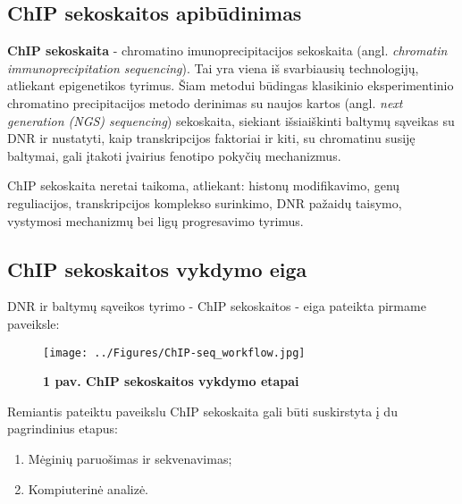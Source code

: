 \documentclass[12pt]{article}
\begin{document}
\subsection{ChIP sekoskaitos apibūdinimas}
\textbf{ChIP sekoskaita} - chromatino imunoprecipitacijos sekoskaita (angl.
\emph{chromatin immunoprecipitation sequencing}). Tai yra viena iš svarbiausių
technologijų, atliekant epigenetikos tyrimus\cite{ARTICLE1}. Šiam metodui
būdingas klasikinio eksperimentinio chromatino precipitacijos metodo derinimas
su naujos kartos (angl. \emph{next generation (NGS) sequencing}) sekoskaita,
siekiant išsiaiškinti baltymų sąveikas su DNR ir nustatyti, kaip transkripcijos
faktoriai ir kiti, su chromatinu susiję baltymai, gali įtakoti įvairius fenotipo
pokyčių mechanizmus\cite{ARTICLE2}.

ChIP sekoskaita neretai taikoma, atliekant: histonų modifikavimo, genų
reguliacijos, transkripcijos komplekso surinkimo, DNR pažaidų taisymo,
vystymosi mechanizmų bei ligų progresavimo tyrimus.


\subsection{ChIP sekoskaitos vykdymo eiga}

DNR ir baltymų sąveikos tyrimo - ChIP sekoskaitos - eiga pateikta pirmame
paveiksle:

\begin{figure}[ht]
    \begin{center}
        \texttt{[image: ../Figures/ChIP-seq\_workflow.jpg]}
        \vspace{-1\baselineskip}
        \caption*{\small\textbf{1 pav. ChIP sekoskaitos vykdymo etapai}}
    \end{center}
\end{figure}

Remiantis pateiktu paveikslu ChIP sekoskaita gali būti suskirstyta į du
pagrindinius etapus:

\begin{enumerate}
    \item Mėginių paruošimas ir sekvenavimas;
    \item Kompiuterinė analizė.
\end{enumerate}
\end{document}
